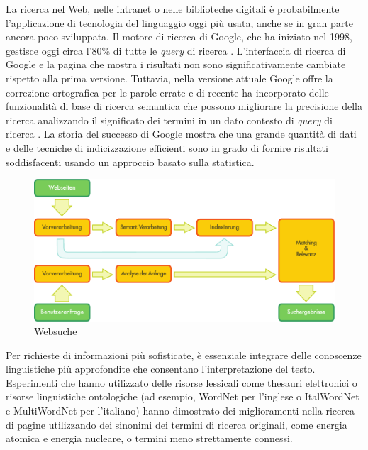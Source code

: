 \documentclass[]{../../metanetpaper}
\begin{document}
\begin{multicols}{2}
La ricerca nel Web, nelle intranet o nelle biblioteche digitali \`{e} probabilmente l'applicazione di tecnologia del linguaggio oggi pi\`{u} usata, anche se  in gran parte ancora poco sviluppata. Il motore di ricerca di Google, che ha iniziato nel 1998, gestisce oggi circa l'80\% di tutte le \emph{query} di ricerca \cite{spi1}. L'interfaccia di ricerca di Google e la pagina che mostra i risultati non sono significativamente cambiate rispetto alla prima versione. Tuttavia, nella versione attuale Google offre la correzione ortografica per le parole errate e di recente ha incorporato delle funzionalit\`{a} di base di ricerca semantica che possono migliorare la precisione della ricerca analizzando il significato dei termini in un dato contesto di \emph{query} di ricerca \cite{pc1}. La storia del successo di Google mostra che una grande quantit\`{a} di dati e delle tecniche di indicizzazione efficienti sono in grado di fornire risultati soddisfacenti usando un approccio basato sulla statistica.


\begin{figure}[htb]
  \center
  \includegraphics[width=\textwidth]{../_media/german/web_search_architecture}
  \caption{Websuche}
  \label{fig:websearcharch_de}
\end{figure}


Per richieste di informazioni pi\`{u} sofisticate, \`{e} essenziale integrare
delle conoscenze linguistiche pi\`{u} approfondite che consentano
l'interpretazione del testo. Esperimenti che hanno utilizzato delle
\underline{risorse lessicali} come thesauri elettronici o risorse linguistiche
ontologiche (ad esempio, WordNet per l'inglese o ItalWordNet e MultiWordNet
per l'italiano) hanno dimostrato dei miglioramenti nella ricerca di pagine
utilizzando dei sinonimi dei termini di ricerca originali, come energia
atomica e energia nucleare, o termini meno strettamente connessi.


\end{multicols}
\end{document}
